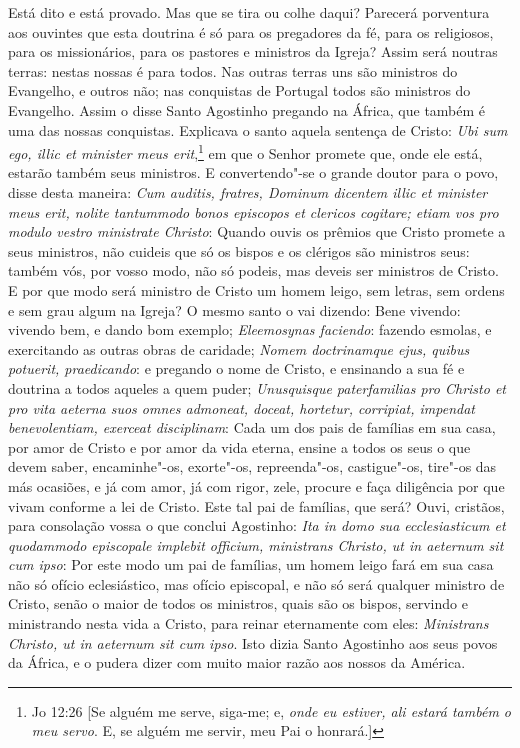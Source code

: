 Está dito e está provado. Mas que se tira ou colhe daqui? Parecerá
porventura aos ouvintes que esta doutrina é só para os pregadores da fé,
para os religiosos, para os missionários, para os pastores e ministros
da Igreja? Assim será noutras terras: nestas nossas é para todos. Nas
outras terras uns são ministros do Evangelho, e outros não; nas
conquistas de Portugal todos são ministros do Evangelho. Assim o disse
Santo Agostinho pregando na África, que também é uma das nossas
conquistas. Explicava o santo aquela sentença de Cristo: \emph{Ubi sum
ego, illic et minister meus erit},\footnote{Jo 12:26 [Se alguém me serve, siga-me; e, \emph{onde eu estiver, ali estará também o meu servo}. E, se alguém me servir, meu Pai o honrará.]} em que o Senhor promete  que, onde ele está, estarão também seus ministros. E convertendo"-se o
grande doutor para o povo, disse desta maneira: \emph{Cum auditis,
fratres, Dominum dicentem illic et minister meus erit, nolite tantummodo
bonos episcopos et clericos cogitare; etiam vos pro modulo vestro
ministrate Christo}: Quando ouvis os prêmios que Cristo promete a seus
ministros, não cuideis que só os bispos e os clérigos são ministros
seus: também vós, por vosso modo, não só podeis, mas deveis ser
ministros de Cristo. E por que modo será ministro de Cristo um homem
leigo, sem letras, sem ordens e sem grau algum na Igreja? O mesmo santo
o vai dizendo: Bene vivendo: vivendo bem, e dando bom exemplo;
\emph{Eleemosynas faciendo}: fazendo esmolas, e exercitando as outras
obras de caridade; \emph{Nomem doctrinamque ejus, quibus potuerit,
praedicando}: e pregando o nome de Cristo, e ensinando a sua fé e
doutrina a todos aqueles a quem puder; \emph{Unusquisque paterfamilias
pro Christo et pro vita aeterna suos omnes admoneat, doceat, hortetur,
corripiat, impendat benevolentiam, exerceat disciplinam}: Cada um dos
pais de famílias em sua casa, por amor de Cristo e por amor da vida
eterna, ensine a todos os seus o que devem saber, encaminhe"-os,
exorte"-os, repreenda"-os, castigue"-os, tire"-os das más ocasiões, e já com
amor, já com rigor, zele, procure e faça diligência por que vivam
conforme a lei de Cristo.
Este tal pai de famílias, que será? Ouvi, cristãos, para consolação
vossa o que conclui Agostinho: \emph{Ita in domo sua ecclesiasticum et
quodammodo episcopale implebit officium, ministrans Christo, ut in
aeternum sit cum ipso}: Por este modo um pai de famílias, um homem leigo
fará em sua casa não só ofício eclesiástico, mas ofício episcopal, e não
só será qualquer ministro de Cristo, senão o maior de todos os
ministros, quais são os bispos, servindo e ministrando nesta vida a
Cristo, para reinar eternamente com eles: \emph{Ministrans Christo, ut
in aeternum sit cum ipso}. Isto dizia Santo Agostinho aos seus povos da
África, e o pudera dizer com muito maior razão aos nossos da América.

